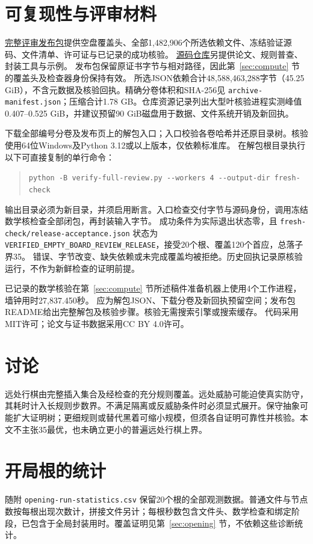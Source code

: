 \documentclass[11pt]{article}
\theoremstyle{definition}
\theoremstyle{remark}
\newcommand{\code}[1]{\texttt{#1}}
\begin{document}
\section{可复现性与评审材料}
\label{sec:repro}
\href{https://github.com/lgqdaxia/infinite-freestyle-gomoku-proof/releases/tag/review-v1-20261004}{完整评审发布包}提供空盘覆盖头、全部1,482,906个所选依赖文件、冻结验证源码、文件清单、许可证与已记录的成功核验。
\href{https://github.com/lgqdaxia/infinite-freestyle-gomoku-proof}{源码仓库}另提供论文、规则普查、封装工具与示例。
发布包保留原证书字节与相对路径，因此第~\ref{sec:compute} 节的覆盖头及检查器身份保持有效。
所选JSON依赖合计48,588,463,288字节（45.25 GiB），不含元数据及核验回执。精确分卷体积和SHA-256见 \code{archive-manifest.json}；压缩合计1.78 GB。仓库资源记录列出大型叶核验进程实测峰值0.407--0.525 GiB，并建议预留90 GiB磁盘用于数据、文件系统开销及新回执。

下载全部编号分卷及发布页上的解包入口；入口校验各卷哈希并还原目录树。核验使用64位Windows及Python 3.12或以上版本，仅依赖标准库。
在解包根目录执行以下可直接复制的单行命令：
\begin{quote}\small
\verb|python -B verify-full-review.py --workers 4 --output-dir fresh-check|
\end{quote}
输出目录必须为新目录，并须启用断言。入口检查交付字节与源码身份，调用冻结数学核检查全部闭包，再封装输入字节。
成功条件为实际退出状态零，且 \code{fresh-check/release-acceptance.json} 状态为 \code{VERIFIED\_EMPTY\_BOARD\_REVIEW\_RELEASE}，接受20个根、覆盖120个首应，总落子界35。
错误、字节改变、缺失依赖或未完成覆盖均被拒绝。历史回执记录原核验运行，不作为新鲜检查的证明前提。

已记录的数学核验在第~\ref{sec:compute} 节所述稿件准备机器上使用4个工作进程，墙钟用时27,837.450秒。
应为解包JSON、下载分卷及新回执预留空间；发布包README给出完整解包及核验步骤。核验无需搜索引擎或搜索缓存。
代码采用MIT许可；论文与证书数据采用CC BY 4.0许可。


\section{讨论}
远处行棋由完整插入集合及经检查的充分规则覆盖。远处威胁可能迫使真实防守，其耗时计入长规则步数界。不满足隔离或反威胁条件时必须显式展开。保守抽象可能扩大证明树；更细规则或替代黑着可缩小规模，但须各自证明可靠性并核验。本文不主张35最优，也未确立更小的普遍远处行棋上界。

\appendix

\section{开局根的统计}\label{app:stats}
随附 \code{opening-run-statistics.csv} 保留20个根的全部观测数据。普通文件与节点数按每根出现次数计，拼接文件另计；每根秒数包含文件头、数学检查和绑定阶段，已包含于全局封装用时。覆盖证明见第~\ref{sec:opening} 节，不依赖这些诊断统计。
\end{document}
